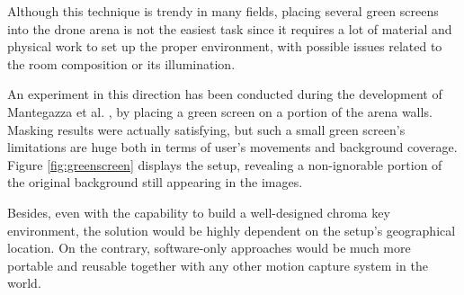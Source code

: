 Although this technique is trendy in many fields, placing several green screens into the drone arena is not the easiest task since it requires a lot of material and physical work to set up the proper environment, with possible issues related to the room composition or its illumination.

An experiment in this direction has been conducted during the development of Mantegazza et al. \cite{mantegazza2019visionbased}, by placing a green screen on a portion of the arena walls. Masking results were actually satisfying, but such a small green screen's limitations are huge both in terms of user's movements and background coverage. Figure \ref{fig:greenscreen} displays the setup, revealing a non-ignorable portion of the original background still appearing in the images.

Besides, even with the capability to build a well-designed chroma key environment, the solution would be highly dependent on the setup's geographical location. On the contrary, software-only approaches would be much more portable and reusable together with any other motion capture system in the world.

